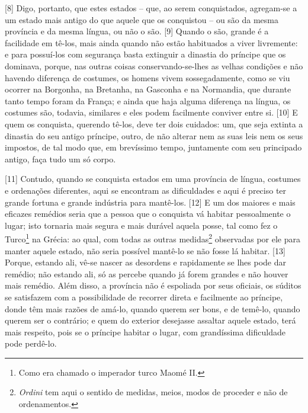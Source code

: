 {[}8{]} Digo, portanto, que estes estados -- que, ao serem conquistados,
agregam-se a um estado mais antigo do que aquele que os conquistou -- ou
são da mesma província e da mesma língua, ou não o são. {[}9{]} Quando o
são, grande é a facilidade em tê-los, mais ainda quando não estão
habituados a viver livremente: e para possuí-los com segurança basta
extinguir a dinastia do príncipe que os dominava, porque, nas outras
coisas conservando-se-lhes as velhas condições e não havendo diferença
de costumes, os homens vivem sossegadamente, como se viu ocorrer na
Borgonha, na Bretanha, na Gasconha e na Normandia, que durante tanto
tempo foram da França; e ainda que haja alguma diferença na língua, os
costumes são, todavia, similares e eles podem facilmente conviver entre
si. {[}10{]} E quem os conquista, querendo tê-los, deve ter dois
cuidados: um, que seja extinta a dinastia do seu antigo príncipe, outro,
de não alterar nem as suas leis nem os seus impostos, de tal modo que, em brevíssimo tempo,
juntamente com seu principado antigo, faça tudo um só corpo.

{[}11{]} Contudo, quando se conquista estados em uma província de
língua, costumes e ordenações diferentes, aqui se encontram as
dificuldades e aqui é preciso ter grande fortuna e grande indústria para
mantê-los. {[}12{]} E um dos maiores e mais eficazes remédios seria que
a pessoa que o conquista vá habitar pessoalmente o lugar; isto tornaria
mais segura e mais durável aquela posse, tal como fez o Turco\footnote{Como
  era chamado o imperador turco Maomé II.} na Grécia: ao qual, com todas
as outras medidas\footnote{\emph{Ordini} tem aqui o sentido de medidas,
  meios, modos de proceder e não de ordenamentos.} observadas por ele
para manter aquele estado, não seria possível mantê-lo se não fosse lá
habitar. {[}13{]} Porque, estando ali, vê-se nascer as desordens e
rapidamente se lhes pode dar remédio; não estando ali, só as percebe
quando já forem grandes e não houver mais remédio. Além disso, a
província não é espoliada por seus oficiais, os súditos se satisfazem
com a possibilidade de recorrer direta e facilmente ao príncipe, donde
têm mais razões de amá-lo, quando querem ser bons, e de temê-lo, quando
querem ser o contrário; e quem do exterior desejasse assaltar aquele
estado, terá mais respeito, pois se o príncipe habitar o lugar, com
grandíssima dificuldade pode perdê-lo.

